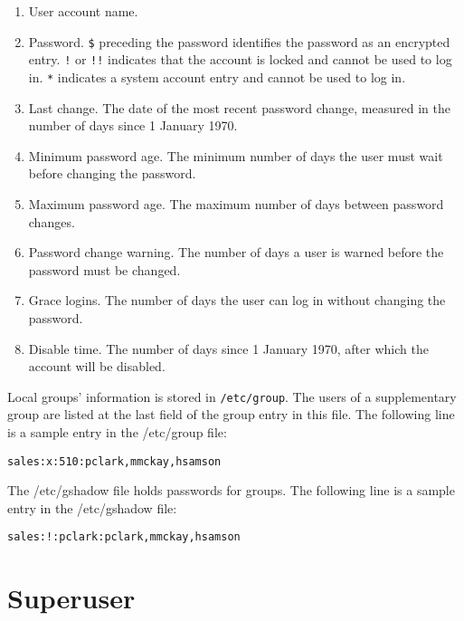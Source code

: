 \begin{enumerate}
\item User account name.
\item Password.	\verb|$| preceding the password identifies the password as an encrypted entry. \verb|!| or \verb|!!| indicates that the account is locked and cannot be used to log in. \verb|*| indicates a system account entry and cannot be used to log in.
\item Last change. The date of the most recent password change, measured in the number of days since 1 January 1970.
\item Minimum password age. The minimum number of days the user must wait before changing the password.
\item Maximum password age. The maximum number of days between password changes.
\item Password change warning. The number of days a user is warned before the password must be changed.
\item Grace logins. The number of days the user can log in without changing the password.
\item Disable time. The number of days since 1 January 1970, after which the account will be disabled.
\end{enumerate}



Local groups' information is stored in \verb|/etc/group|. The users of a supplementary group are listed at the last field of the group entry in this file. The following line is a sample entry in the /etc/group file:

\begin{verbatim}
sales:x:510:pclark,mmckay,hsamson
\end{verbatim}

The /etc/gshadow file holds passwords for groups. The following line is a sample entry in the /etc/gshadow file:

\begin{verbatim}
sales:!:pclark:pclark,mmckay,hsamson
\end{verbatim}

\section{Superuser}


